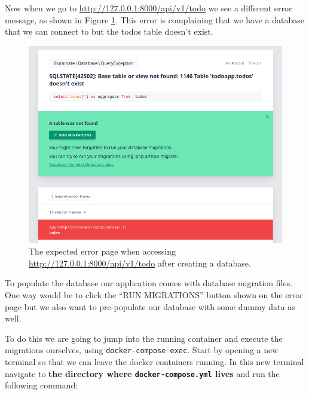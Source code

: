 \documentclass{csse4400}
\begin{document}
Now when we go to \url{http://127.0.0.1:8000/api/v1/todo} we see a different error message, as shown in Figure \ref{fig:missing-tables}.
This error is complaining that we have a database that we can connect to but the todos table doesn't exist.

\begin{figure}[ht]
\includegraphics[width=\textwidth]{images/missing-tables}
\caption{The expected error page when accessing \url{http://127.0.0.1:8000/api/v1/todo} after creating a database.}
\label{fig:missing-tables}
\end{figure}

To populate the database our application comes with database migration files.
One way would be to click the ``RUN MIGRATIONS'' button shown on the error page but we also want to pre-populate our database with some dummy data as well.

To do this we are going to jump into the running container and execute the migrations ourselves, using \texttt{docker-compose exec}.
Start by opening a new terminal so that we can leave the docker containers running.
In this new terminal navigate to \textbf{the directory where \texttt{docker-compose.yml} lives} and run the following 
command:

\end{document}
